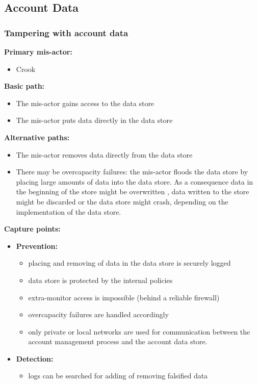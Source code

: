 \documentclass[a4paper,11pt]{report}
\begin{document}
\subsection{Account Data}
\subsubsection{Tampering with account data}
\textbf{Primary mis-actor:}
\begin{itemize}
\item Crook
\end{itemize}
\textbf{Basic path:}
\begin{itemize}
\item The mis-actor gains access to the data store
\item The mis-actor puts data directly in the data store
\end{itemize}
\textbf{Alternative paths:}
\begin{itemize}
\item The mis-actor removes data directly from the data store
\item There may be overcapacity failures: the mis-actor floods the data store by placing large 
amounts of data into the data store. As a consequence data in the beginning of the store might be overwritten
, data written to the store might be discarded or the data store might crash, depending on the implementation of
the data store.
\end{itemize}
\textbf{Capture points:}
\begin{itemize}
\item \textbf{Prevention:}
\begin{itemize}
\item placing and removing of data in the data store is securely logged
\item data store is protected by the internal policies
\item extra-monitor access is impossible (behind a reliable firewall)
\item overcapacity failures are handled accordingly
\item only private or local networks are used for communication between the account management process 
and the account data store.
\end{itemize}
\item \textbf{Detection:}
\begin{itemize}
\item logs can be searched for adding of removing falsified data
\end{itemize}
\end{itemize}
\end{document}
